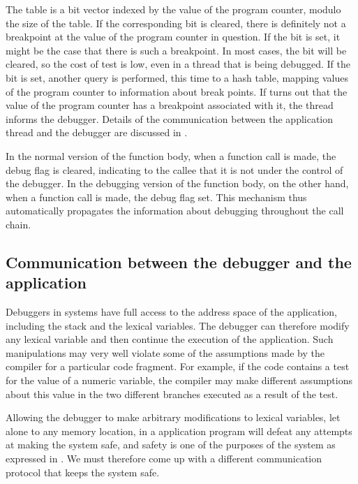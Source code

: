 The table is a bit vector indexed by the value of the program counter,
modulo the size of the table.  If the corresponding bit is cleared,
there is definitely not a breakpoint at the value of the program
counter in question.  If the bit is set, it might be the case that
there is such a breakpoint.  In most cases, the bit will be cleared,
so the cost of test is low, even in a thread that is being debugged.
If the bit is set, another query is performed, this time to a hash
table, mapping values of the program counter to information about
break points.  If turns out that the value of the program counter has
a breakpoint associated with it, the thread informs the debugger.
Details of the communication between the application thread and the
debugger are discussed in
.

In the normal version of the function body, when a function call is
made, the debug flag is cleared, indicating to the callee that it is
not under the control of the debugger.  In the debugging version of
the function body, on the other hand, when a function call is
made, the debug flag set.  This mechanism thus automatically
propagates the information about debugging throughout the call chain.

\subsection{Communication between the debugger and the application}
\label{sec-debugger-application-communication}

Debuggers in \unix{} systems have full access to the address space of
the application, including the stack and the lexical variables.  The
debugger can therefore modify any lexical variable and then continue
the execution of the application.  Such manipulations may very well
violate some of the assumptions made by the compiler for a particular
code fragment.  For example, if the code contains a test for the value
of a numeric variable, the compiler may make different assumptions
about this value in the two different branches executed as a result of
the test.

Allowing the debugger to make arbitrary modifications to lexical
variables, let alone to any memory location, in a \commonlisp{}
application program will defeat any attempts at making the system
safe, and safety is one of the purposes of the \sicl{} system as
expressed in .  We must therefore come up
with a different communication protocol that keeps the system safe.

